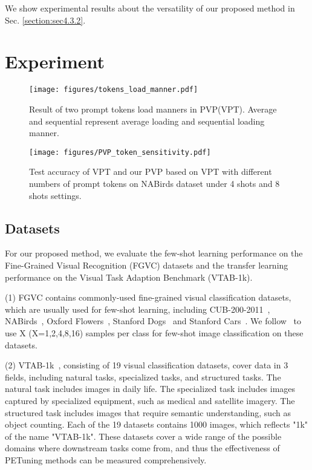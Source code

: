 \documentclass[10pt,journal,letterpaper,compsoc]{IEEEtran}
\begin{document}
We show experimental results about the versatility of our proposed method in Sec. \ref{section:sec4.3.2}.

\section{Experiment}

\begin{figure*}[t]
    \centering
    \texttt{[image: figures/tokens\_load\_manner.pdf]}
    \caption{Result of two prompt tokens load manners in PVP(VPT). Average and sequential represent average loading and sequential loading manner.}
    \label{fig:FULL_VPPTavg_VPPT}
\end{figure*}
\begin{figure}[h]
    \centering
    \texttt{[image: figures/PVP\_token\_sensitivity.pdf]}
    \caption{Test accuracy of VPT and our PVP based on VPT with different numbers of prompt tokens on NABirds dataset under 4 shots and 8 shots settings.}
    \label{fig:sensitivity}
\end{figure}

\subsection{Datasets}
For our proposed method, we evaluate the few-shot learning performance on the Fine-Grained Visual Recognition (FGVC) datasets and the transfer learning performance on the Visual Task Adaption Benchmark (VTAB-1k).

(1) FGVC contains commonly-used fine-grained visual classification datasets, which are usually used for few-shot learning, including CUB-200-2011~\cite{cub}, NABirds~\cite{nabirds}, Oxford Flowers~\cite{flowers}, Stanford Dogs~\cite{dogs} and Stanford Cars~\cite{cars}. We follow~\cite{NOAH,SSF} to use X (X=1,2,4,8,16) samples per class for few-shot image classification on these datasets.

(2) VTAB-1k~\cite{VTAB}, consisting of 19 visual classification datasets, cover data in 3 fields, including natural tasks, specialized tasks, and structured tasks. The natural task includes images in daily life. The specialized task includes images captured by specialized equipment, such as medical and satellite imagery. The structured task includes images that require semantic understanding, such as object counting. Each of the 19 datasets contains 1000 images, which reflects "1k" of the name "VTAB-1k". These datasets cover a wide range of the possible domains where downstream tasks come from, and thus the effectiveness of PETuning methods can be measured comprehensively.
\end{document}

